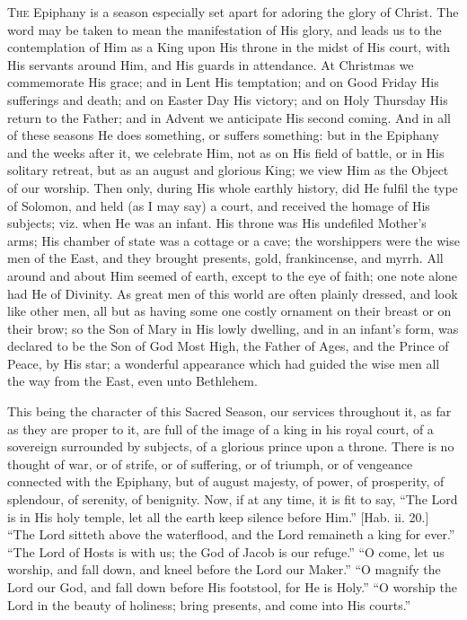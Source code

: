 T\textsc{he} Epiphany is a season especially set apart for adoring the glory
of Christ. The word may be taken to mean the manifestation of His
glory, and leads us to the contemplation of Him as a King upon His
throne in the midst of His court, with His servants around Him, and
His guards in attendance. At Christmas we commemorate His grace; and
in Lent His temptation; and on Good Friday His sufferings and death;
and on Easter Day His victory; and on Holy Thursday His return to the
Father; and in Advent we anticipate His second coming. And in all of
these seasons He does something, or suffers something: but in the
Epiphany and the weeks after it, we celebrate Him, not as on His field
of battle, or in His solitary retreat, but as an august and glorious
King; we view Him as the Object of our worship. Then only, during His
whole earthly history, did He fulfil the type of Solomon, and held (as
I may say) a court, and received the homage of His subjects; viz. when
He was an infant. His throne was His undefiled Mother's arms; His
chamber of state was a cottage or a cave; the worshippers were the
wise men of the East, and they brought presents, gold, frankincense,
and myrrh. All around and about Him seemed of earth, except to the eye
of faith; one note alone had He of Divinity. As great men of this
world are often plainly dressed, and look like other men, all but as
having some one costly ornament on their breast or on their brow; so
the Son of Mary in His lowly dwelling, and in an infant's form, was
declared to be the Son of God Most High, the Father of Ages, and the
Prince of Peace, by His star; a wonderful appearance which had guided
the wise men all the way from the East, even unto Bethlehem.

This being the character of this Sacred Season, our services
throughout it, as far as they are proper to it, are full of the image
of a king in his royal court, of a sovereign surrounded by subjects,
of a glorious prince upon a throne. There is no thought of war, or of
strife, or of suffering, or of triumph, or of vengeance connected with
the Epiphany, but of august majesty, of power, of prosperity, of
splendour, of serenity, of benignity. Now, if at any time, it is fit
to say, ``The Lord is in His holy temple, let all the earth keep
silence before Him.'' [Hab. ii. 20.] ``The Lord sitteth above
the waterflood, and the Lord remaineth a king for ever.''
``The Lord of Hosts is with us; the God of Jacob is our
refuge.'' ``O come, let us worship, and fall down, and kneel
before the Lord our Maker.'' ``O magnify the Lord our God, and
fall down before His footstool, for He is Holy.'' ``O worship
the Lord in the beauty of holiness; bring presents, and come into His
courts.''

